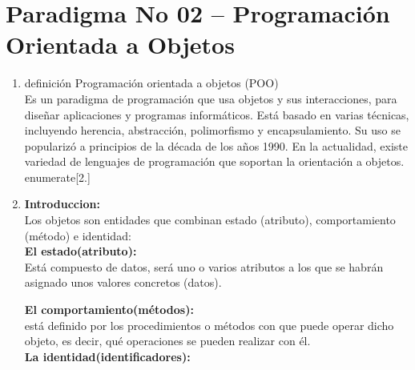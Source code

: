 \section{Paradigma No 02 – Programación Orientada a Objetos} 

\begin{enumerate}[1.]
	\item definición Programación orientada a objetos (POO)\\

Es un paradigma de programación que usa objetos y sus interacciones, para diseñar aplicaciones y programas informáticos. Está basado en varias técnicas, incluyendo herencia, abstracción, polimorfismo y encapsulamiento. Su uso se popularizó a principios de la década de los años 1990. En la actualidad, existe variedad de lenguajes de programación que soportan la orientación a objetos.\\
{enumerate}[2.]
\item \textbf{Introduccion:}\\

Los objetos son entidades que combinan estado (atributo), comportamiento (método) e identidad:\\

\textbf{El estado(atributo):}\\

Está compuesto de datos, será uno o varios atributos a los que se habrán asignado unos valores concretos (datos).

\textbf{El comportamiento(métodos):}\\

está definido por los procedimientos o métodos con que puede operar dicho objeto, es decir, qué operaciones se pueden realizar con él.\\

\textbf{La identidad(identificadores):}\\


\end{enumerate}
